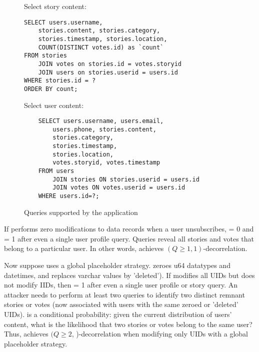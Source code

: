 \begin{figure*}
    \centering
\begin{minipage}[t]{0.45\textwidth}
    \centering
    Select story content:
\begin{verbatim}
SELECT users.username, 
    stories.content, stories.category, 
    stories.timestamp, stories.location, 
    COUNT(DISTINCT votes.id) as `count`
FROM stories 
    JOIN votes on stories.id = votes.storyid
    JOIN users on stories.userid = users.id
WHERE stories.id = ?
ORDER BY count;
\end{verbatim}
\end{minipage}
\begin{minipage}[t]{0.45\textwidth}
    \centering
    Select user content:
\begin{verbatim}
    SELECT users.username, users.email, 
        users.phone, stories.content, 
        stories.category, 
        stories.timestamp, 
        stories.location, 
        votes.storyid, votes.timestamp 
    FROM users 
        JOIN stories ON stories.userid = users.id 
        JOIN votes ON votes.userid = users.id
    WHERE users.id=?;
\end{verbatim}
\end{minipage}
    \caption{Queries supported by the application}
\label{fig:appqs}
\end{figure*}
If \sys{} performs zero modifications to data records when a user unsubscribes, \premnant{} = 0 and
\plinked{} = 1 after even a single user profile query. Queries reveal all stories and votes that belong to a particular user. In other
words, \sys{} achieves $(Q \geq 1, 1)$-decorrelation.

Now suppose \sys{} uses a global placeholder strategy.  \sys{} zeroes u64 datatypes and datetimes,
and replaces varchar values by 'deleted').  If \sys{} modifies all UIDs but does not modify IIDs,
then \premnant{} = 1 after even a single user profile or story query.  An attacker needs to perform
at least two queries to identify two distinct remnant stories or votes (now associated with users with
the same zeroed or 'deleted' UIDs). 
\plinked{} is a conditional probability: given the current distribution of users' content, what is
the likelihood that two stories or votes belong to the same user?
Thus, \sys{} achieves $(Q \geq 2$, \plinked{})-decorrelation when modifying only UIDs with a global
placeholder strategy.
\fi
